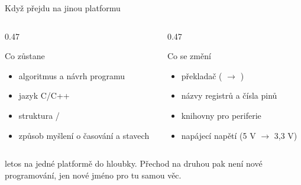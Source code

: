 \documentclass[12pt,aspectratio=169]{beamer}
\begin{document}
\begin{frame}{Když přejdu na jinou platformu}
  \begin{columns}[T]
    \begin{column}{0.47\textwidth}
      \begin{exampleblock}{Co zůstane}
        \small
        \begin{itemize}
          \item algoritmus a návrh programu
          \item jazyk C/C++
          \item struktura  / 
          \item způsob myšlení o časování a stavech
        \end{itemize}
      \end{exampleblock}
    \end{column}
    \begin{column}{0.47\textwidth}
      \begin{alertblock}{Co se změní}
        \small
        \begin{itemize}
          \item překladač ( $\to$ )
          \item názvy registrů a čísla pinů
          \item knihovny pro periferie
          \item napájecí napětí (5 V $\to$ 3,3 V)
        \end{itemize}
      \end{alertblock}
    \end{column}
  \end{columns}
  \vspace{2mm}
  \small
   letos na jedné platformě do hloubky. Přechod na
  druhou pak není nové programování, jen nové jméno pro tu samou věc.
\end{frame}
\end{document}
